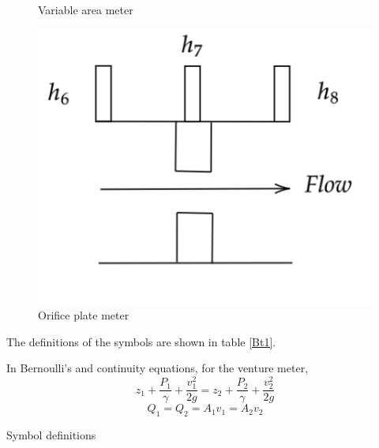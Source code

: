 \begin{figure}
\begin{minipage}[h]{0.3\textwidth}
    \caption{Variable area meter}
    \label{Bf2}
\end{minipage}
\begin{minipage}[h]{0.33\textwidth} %
    \centering
    \includegraphics[scale=0.5]{Results/B2.png}
    \caption{Orifice plate meter}
    \label{Bf3}
\end{minipage}
\end{figure}

The definitions of the symbols are shown in table \ref{Bt1}.

In Bernoulli's and continuity equations, for the venture meter,
\begin{equation}
    z_1+\frac{P_1}{\gamma}+\frac{v_1^2}{2g}=z_2+\frac{P_2}{\gamma}+\frac{v_2^2}{2g}
    \label{Be1}
\end{equation}
\begin{equation}
    Q_1=Q_2=A_1v_1=A_2v_2
    \label{Be2}
\end{equation}

\begin{minipage}[t]{\textwidth}
    \centering
\makeatletter{}
\caption{Symbol definitions}
\label{Bt1}
\end{minipage}



